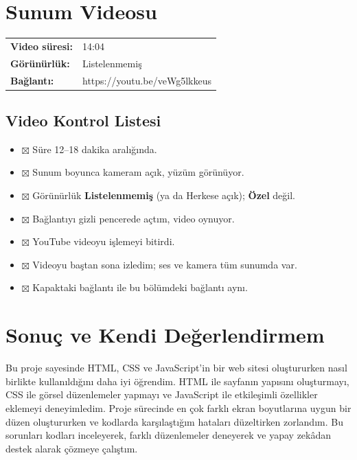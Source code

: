 \documentclass[12pt,a4paper]{article}
\begin{document}
\section{Sunum Videosu}
\begin{center}
\begin{tabular}{@{}ll@{}}
\textbf{Video süresi:} & 14:04 \quad \\
\textbf{Görünürlük:} & Listelenmemiş \\
\textbf{Bağlantı:} &https://youtu.be/veWg5lkkeus\\
\end{tabular}
\end{center}

\subsection{Video Kontrol Listesi}
\begin {itemize}[label={}] 
  \item $\boxtimes$ Süre 12--18 dakika aralığında.
  \item $\boxtimes$ Sunum boyunca kameram açık, yüzüm görünüyor.
  \item $\boxtimes$ Görünürlük \textbf{Listelenmemiş} (ya da Herkese açık); \textbf{Özel} değil.
  \item $\boxtimes$ Bağlantıyı gizli pencerede açtım, video oynuyor.
  \item $\boxtimes$ YouTube videoyu işlemeyi bitirdi.
  \item $\boxtimes$ Videoyu baştan sona izledim; ses ve kamera tüm sunumda var.
  \item $\boxtimes$ Kapaktaki bağlantı ile bu bölümdeki bağlantı aynı.
\end{itemize}

\section{Sonuç ve Kendi Değerlendirmem}
Bu proje sayesinde HTML, CSS ve JavaScript'in bir web sitesi oluştururken nasıl birlikte kullanıldığını daha iyi öğrendim. HTML ile sayfanın yapısını oluşturmayı, CSS ile görsel düzenlemeler yapmayı ve JavaScript ile etkileşimli özellikler eklemeyi deneyimledim. Proje sürecinde en çok farklı ekran boyutlarına uygun bir düzen oluştururken ve kodlarda karşılaştığım hataları düzeltirken zorlandım. Bu sorunları kodları inceleyerek, farklı düzenlemeler deneyerek ve yapay zekâdan destek alarak çözmeye çalıştım.
\end{document}
